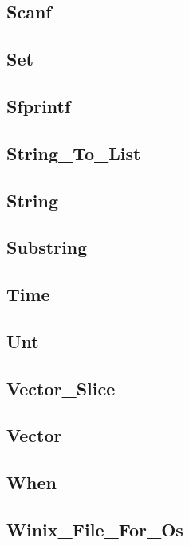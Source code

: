 \subsection{Scanf}                                      
\subsection{Set}					
\subsection{Sfprintf}                                   
\subsection{String\_To\_List}				
\subsection{String}                                     
\subsection{Substring}					
\subsection{Time}					
\subsection{Unt}					
\subsection{Vector\_Slice}				
\subsection{Vector}					
\subsection{When}					
\subsection{Winix\_File\_For\_Os}			

